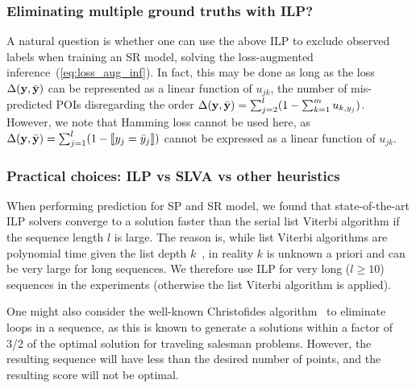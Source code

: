 \subsubsection{Eliminating multiple ground truths with ILP?}
A natural question is whether one can use the above ILP
to exclude observed labels when training an SR model,
\ie solving the loss-augmented inference~(\ref{eq:loss_aug_inf}).
In fact, this may be done
as long as the loss $\Delta(\mathbf{y},\bar{\mathbf{y}})$ can be represented as a linear function of $u_{jk}$,
\eg the number of mis-predicted POIs disregarding the order $\Delta(\mathbf{y}, \bar{\mathbf{y}}) = \sum_{j=2}^l (1 - \sum_{k=1}^m u_{k, y_j})$.
However, we note that Hamming loss %
cannot be used here, as $\Delta(\mathbf{y},\bar{\mathbf{y}}) = \sum_{j=1}^l (1 - \llbracket y_j = \bar y_j \rrbracket)$
cannot be expressed as a linear function of $u_{jk}$.


\subsubsection{Practical choices: ILP vs SLVA vs other heuristics}
When performing prediction for SP and SR model, we found that state-of-the-art ILP solvers converge to a solution faster
than the serial list Viterbi algorithm if the sequence length $l$ is large.
The reason is, while list Viterbi algorithms are polynomial time given the list depth $k$~\cite{nilsson2001sequentially},
in reality $k$ is unknown a priori and can be very large for long sequences.
We therefore use ILP for very long ($l\ge10$) sequences in the experiments (otherwise the list Viterbi algorithm is applied).

One might also consider the well-known Christofides algorithm~\cite{christofides1976} to eliminate loops in a sequence, as this is known to generate a solutions within a factor of 3/2 of the optimal solution for traveling salesman problems. However, the resulting sequence will have less than the desired number of points, and the resulting score will not be optimal.


